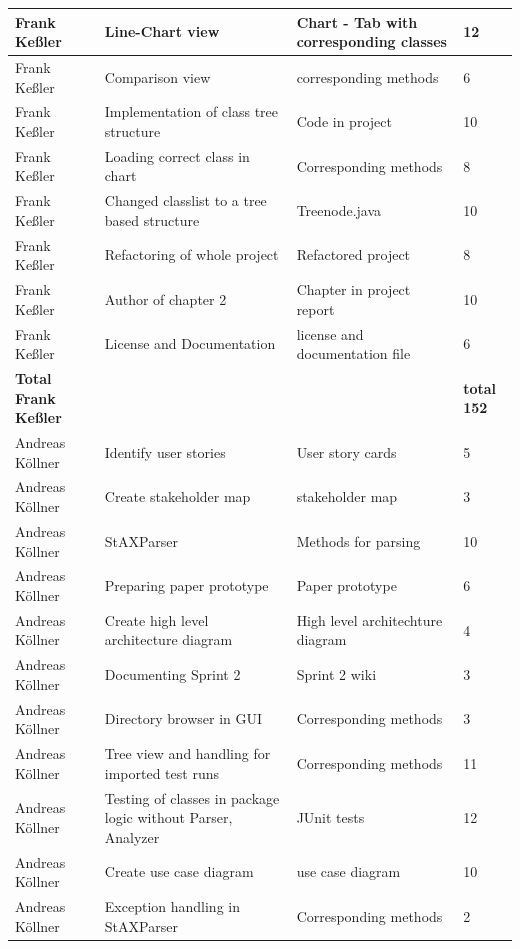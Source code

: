 \begin{longtable}{|p{}||p{}|p{}|p{}|}
    \hline
    Frank Keßler & Line-Chart view & Chart - Tab with corresponding classes & 12 \\ 
    \hline
    Frank Keßler & Comparison view & corresponding methods & 6\\
    \hline
    Frank Keßler & Implementation of class tree structure & Code in project & 10 \\
    \hline
    Frank Keßler & Loading correct class in chart & Corresponding methods & 8 \\ 
    \hline
    Frank Keßler & Changed classlist to a tree based structure & Treenode.java & 10 \\ 
    \hline
    Frank Keßler & Refactoring of whole project & Refactored project & 8 \\ 
    \hline
    Frank Keßler & Author of chapter 2 & Chapter in project report & 10 \\ 
    \hline
    Frank Keßler & License and Documentation & license and documentation file & 6 \\
    \hline
    \hline 
    \textbf{Total \newline Frank Keßler} & & & \textbf{total 152}   \\
    \hline
    \hline
    Andreas Köllner & Identify user stories & User story cards & 5 \\
    \hline
    Andreas Köllner & Create stakeholder map & stakeholder map & 3 \\ 
    \hline
    Andreas Köllner & StAXParser & Methods for parsing & 10 \\ 
    \hline
    Andreas Köllner & Preparing paper prototype & Paper prototype & 6 \\
    \hline
    Andreas Köllner & Create high level architecture diagram & High level architechture diagram & 4 \\ 
    \hline
    Andreas Köllner & Documenting Sprint 2 & Sprint 2 wiki & 3 \\ 
    \hline 
    Andreas Köllner & Directory browser in GUI & Corresponding methods & 3 \\ 
    \hline
    Andreas Köllner & Tree view and handling for imported test runs & Corresponding methods & 11 \\ 
    \hline
    Andreas Köllner & Testing of classes in package logic without Parser, Analyzer & JUnit tests & 12 \\ 
    \hline 
    Andreas Köllner & Create use case diagram & use case diagram & 10 \\ 
    \hline
    Andreas Köllner & Exception handling in StAXParser & Corresponding methods & 2 \\ 

\end{longtable}
